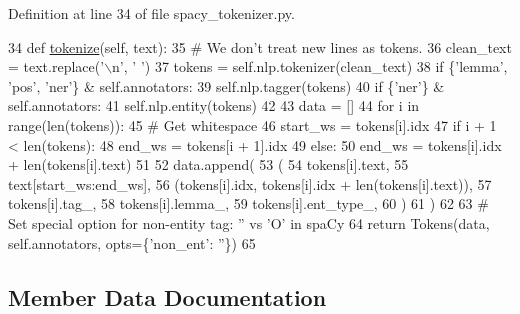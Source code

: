 Definition at line 34 of file spacy\+\_\+tokenizer.\+py.


\begin{DoxyCode}
34     \textcolor{keyword}{def }\hyperlink{namespaceparlai_1_1agents_1_1tfidf__retriever_1_1build__tfidf_a1fdb457e98eb4e4c26047e229686a616}{tokenize}(self, text):
35         \textcolor{comment}{# We don't treat new lines as tokens.}
36         clean\_text = text.replace(\textcolor{stringliteral}{'\(\backslash\)n'}, \textcolor{stringliteral}{' '})
37         tokens = self.nlp.tokenizer(clean\_text)
38         \textcolor{keywordflow}{if} \{\textcolor{stringliteral}{'lemma'}, \textcolor{stringliteral}{'pos'}, \textcolor{stringliteral}{'ner'}\} & self.annotators:
39             self.nlp.tagger(tokens)
40         \textcolor{keywordflow}{if} \{\textcolor{stringliteral}{'ner'}\} & self.annotators:
41             self.nlp.entity(tokens)
42 
43         data = []
44         \textcolor{keywordflow}{for} i \textcolor{keywordflow}{in} range(len(tokens)):
45             \textcolor{comment}{# Get whitespace}
46             start\_ws = tokens[i].idx
47             \textcolor{keywordflow}{if} i + 1 < len(tokens):
48                 end\_ws = tokens[i + 1].idx
49             \textcolor{keywordflow}{else}:
50                 end\_ws = tokens[i].idx + len(tokens[i].text)
51 
52             data.append(
53                 (
54                     tokens[i].text,
55                     text[start\_ws:end\_ws],
56                     (tokens[i].idx, tokens[i].idx + len(tokens[i].text)),
57                     tokens[i].tag\_,
58                     tokens[i].lemma\_,
59                     tokens[i].ent\_type\_,
60                 )
61             )
62 
63         \textcolor{comment}{# Set special option for non-entity tag: '' vs 'O' in spaCy}
64         \textcolor{keywordflow}{return} Tokens(data, self.annotators, opts=\{\textcolor{stringliteral}{'non\_ent'}: \textcolor{stringliteral}{''}\})
65 \end{DoxyCode}


\subsection{Member Data Documentation}
\mbox{\label{classparlai_1_1agents_1_1tfidf__retriever_1_1tokenizers_1_1spacy__tokenizer_1_1SpacyTokenizer_a6d3d9c1c8632f0b1ec559b3bbef9fe60}} 
